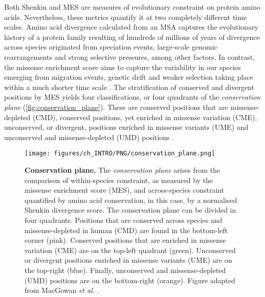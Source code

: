 Both Shenkin and MES are measures of evolutionary constraint on protein amino acids. Nevertheless, these metrics quantify it at two completely different time scales. Amino acid divergence calculated from an MSA captures the evolutionary history of a protein family resulting of hundreds of millions of years of divergence across species originated from speciation events, large-scale genomic rearrangements and strong selective pressures, among other factors. In contrast, the missense enrichment score aims to capture the variability in our species emerging from migration events, genetic drift and weaker selection taking place within a much shorter time scale \cite{HUBLIN_2017_HUMAN}. The stratification of conserved and divergent positions by MES yields four classifications, or four quadrants of the \textit{conservation plane} (\autoref{fig:conservation_plane}). These are conserved positions that are missense-depleted (CMD), conserved positions, yet enriched in missense variation (CME), unconserved, or divergent, positions enriched in missense variants (UME) and unconserved and missense-depleted (UMD) positions \cite{MACGOWAN_2024_VARIANTS}.

\begin{figure}[htb!]
    \centering
    \texttt{[image: figures/ch\_INTRO/PNG/conservation\_plane.png]}
    \caption[Conservation plane]{\textbf{Conservation plane.} The \textit{conservation plane} arises from the comparison of within-species constraint, as measured by the missense enrichment score (MES), and across-species constraint quantified by amino acid conservation, in this case, by a normalised Shenkin divergence score. The conservation plane can be divided in four quadrants. Positions that are conserved across species and missense-depleted in human (CMD) are found in the bottom-left corner (pink). Conserved positions that are enriched in missense variation (CME) are on the top-left quadrant (green). Unconserved or divergent positions enriched in missense variants (UME) are on the top-right (blue). Finally, unconserved and missense-depleted (UMD) positions are on the bottom-right (orange). Figure adapted from MacGowan \textit{et al.} \cite{MACGOWAN_2024_VARIANTS}.}
    \label{fig:conservation_plane}
\end{figure}

